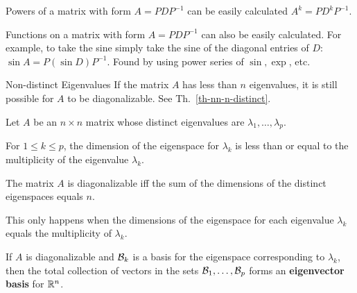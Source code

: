 \begin{card}
    \begin{compactdesc}
    \item[Powers of a matrix] with form $A = PDP^{-1}$ can be easily calculated
        $A^k = PD^kP^{-1}$.
    \item[Functions on a matrix] with form $A = PDP^{-1}$ can also be easily
        calculated. For example, to take the sine simply take the sine of the
        diagonal entries of $D$: $\sin A = P (\sin D) P^{-1}$.
        Found by using power series of $\sin, \exp$, etc.
    \item[Non-distinct Eigenvalues]
    If the matrix $A$ has less than $n$ eigenvalues, it is still possible
    for $A$ to be diagonalizable. See Th.~\ref{th-nn-n-distinct}.
    \end{compactdesc}

    \begin{theorem}\label{th-nn-n-distinct}
    Let $A$ be an $n \times n$ matrix
    whose distinct eigenvalues are $\lambda_1, \dotsc, \lambda_p$.
    \begin{compactenum}
    \item For $1 \leq k \leq p$, the dimension of the eigenspace for $\lambda_k$
        is less than or equal to the multiplicity of the eigenvalue $\lambda_k$.
    \item The matrix $A$ is diagonalizable iff the sum of the dimensions of the
        distinct eigenspaces equals $n$.

        This only happens when the dimensions of the eigenspace for each
        eigenvalue $\lambda_k$ equals the multiplicity of $\lambda_k$.
    \item If $A$ is diagonalizable and $\mathcal{B}_k$ is a basis for the eigenspace
        corresponding to $\lambda_k$, then the total collection of vectors
        in the sets $\mathcal{B}_1, \dotsc, \mathcal{B}_p$
        forms an \textbf{eigenvector basis} for $\mathbb{R}^n$.
    \end{compactenum}
    \end{theorem}

\end{card}


